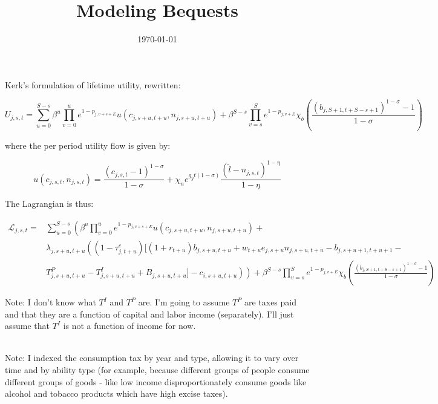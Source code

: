 \documentclass[article,11pt,letterpaper,fleqn]{article}
\title{Modeling Bequests}
\date{\today}
\theoremstyle{definition}
\numberwithin{equation}{section}
\begin{document}

\maketitle

Kerk's formulation of lifetime utility, rewritten:

\begin{equation}
\label{eqn:life_util}
U_{j,s,t} = \sum_{u=0}^{S-s}\beta^{u}\prod_{v=0}^{u}e^{1-p_{j,v+s+E}} u(c_{j,s+u,t+u},n_{j,s+u,t+u}) + \beta^{S-s}\prod_{v=s}^{S}e^{1-p_{j,v+E}} \chi_{b}\left(\frac{(b_{j,S+1,t+S-s+1})^{1-\sigma}-1}{1-\sigma}\right)
\end{equation}

where the per period utility flow is given by:

\begin{equation}
\label{eqn:period_util}
u(c_{j,s,t},n_{j,s,t}) = \frac{(c_{j,s,t}-1)^{1-\sigma}}{1-\sigma} + \chi_{n}e^{g_{y}t(1-\sigma)}\frac{(\tilde{l}-n_{j,s,t})^{1-\eta}}{1-\eta}
\end{equation}

The Lagrangian is thus: 

\begin{equation}
\label{eqn:lagrangian}
\begin{split}
\mathcal{L}_{j,s,t} = &  \sum_{u=0}^{S-s}\left(\beta^{u}\prod_{v=0}^{u}e^{1-p_{j,v+s+E}} u(c_{j,s+u,t+u},n_{j,s+u,t+u})  + \right. \\
 & \left. \lambda_{j,s+u,t+u}\left((1-\tau^{c}_{j,t+u})[(1+r_{t+u})b_{j,s+u,t+u}+w_{t+u}e_{j,s+u}n_{j,s+u,t+u}-b_{j,s+u+1,t+u+1}- \right.\right. \\
 & \left.\left. T^{P}_{j,s+u,t+u} - T^{I}_{j,s+u,t+u}+B_{j,s+u,t+u}]-c_{i,s+u,t+u}\right)\right) + \beta^{S-s}\prod_{v=s}^{S}e^{1-p_{j,v+E}} \chi_{b}\left(\frac{(b_{j,S+1,t+S-s+1})^{1-\sigma}-1}{1-\sigma}\right)
\end{split}	
\end{equation}

Note: I don't know what $T^{I}$ and $T^{P}$ are.  I'm going to assume $T^{P}$ are taxes paid and that they are a function of capital and labor income (separately).  I'll just assume that $T^{I}$ is not a function of income for now.

\ \\

Note: I indexed the consumption tax by year and type, allowing it to vary over time and by ability type (for example, because different groups of people consume different groups of goods - like low income disproportionately consume goods like alcohol and tobacco products which have high excise taxes). 
\end{document}
